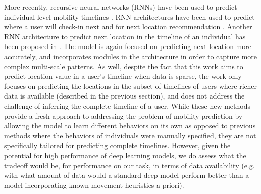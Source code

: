 More recently, recursive neural networks (RNNs) have been used to predict individual level mobility timelines \cite{feng2018deepmove,yang2017neural,liu2016predicting}. RNN architectures have been used to predict where a user will check-in next \cite{liu2016predicting} and for next location recommendation \cite{yang2017neural}. Another RNN architecture to predict next location in the timeline of an individual has been proposed in \cite{feng2018deepmove}. The model is again focused on predicting next location more accurately, and incorporates modules in the architecture in order to capture more complex multi-scale patterns. As well, despite the fact that this work aims to predict location value in a user's timeline when data is sparse, the work only focuses on predicting the locations in the subset of timelines of users where richer data is available (described in the previous section), and does not address the challenge of inferring the complete timeline of a user. While these new methods provide a fresh approach to addressing the problem of mobility prediction by allowing the model to learn different behaviors on its own as opposed to previous methods where the behaviors of individuals were manually specified, they are not specifically tailored for predicting complete timelines.
However, given the potential for high performance of deep learning models, we do assess what the tradeoff would be, for performance on our task, in terms of data availability (e.g. with what amount of data would a standard deep model perform better than a model incorporating known movement heuristics a priori). 


